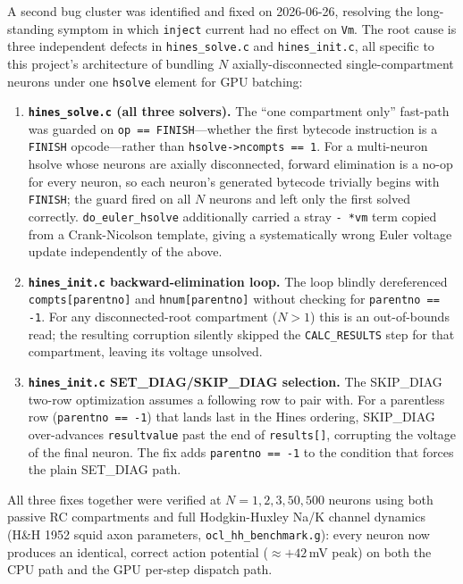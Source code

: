 \documentclass[11pt,a4paper]{article}
\begin{document}
A second bug cluster was identified and fixed on 2026-06-26, resolving the
long-standing symptom in which \texttt{inject} current had no effect on \texttt{Vm}.
The root cause is three independent defects in \texttt{hines\_solve.c} and
\texttt{hines\_init.c}, all specific to this project's architecture of bundling $N$
axially-disconnected single-compartment neurons under one \texttt{hsolve} element for
GPU batching:

\begin{enumerate}

\item \textbf{\texttt{hines\_solve.c} (all three solvers).} The ``one compartment only''
fast-path was guarded on \texttt{op == FINISH}---whether the first bytecode instruction
is a \texttt{FINISH} opcode---rather than \texttt{hsolve->ncompts == 1}. For a
multi-neuron hsolve whose neurons are axially disconnected, forward elimination is a
no-op for every neuron, so each neuron's generated bytecode trivially begins with
\texttt{FINISH}; the guard fired on all $N$ neurons and left only the first solved
correctly. \texttt{do\_euler\_hsolve} additionally carried a stray \texttt{-{} *vm}
term copied from a Crank-Nicolson template, giving a systematically wrong Euler voltage
update independently of the above.

\item \textbf{\texttt{hines\_init.c} backward-elimination loop.} The loop blindly
dereferenced \texttt{compts[parentno]} and \texttt{hnum[parentno]} without checking for
\texttt{parentno == -1}. For any disconnected-root compartment ($N > 1$) this is an
out-of-bounds read; the resulting corruption silently skipped the \texttt{CALC\_RESULTS}
step for that compartment, leaving its voltage unsolved.

\item \textbf{\texttt{hines\_init.c} SET\_DIAG/SKIP\_DIAG selection.} The SKIP\_DIAG
two-row optimization assumes a following row to pair with. For a parentless row
(\texttt{parentno == -1}) that lands last in the Hines ordering, SKIP\_DIAG
over-advances \texttt{resultvalue} past the end of \texttt{results[]}, corrupting the
voltage of the final neuron. The fix adds \texttt{parentno == -1} to the condition that
forces the plain SET\_DIAG path.

\end{enumerate}

All three fixes together were verified at $N = 1, 2, 3, 50, 500$ neurons using both
passive RC compartments and full Hodgkin-Huxley Na/K channel dynamics (H\&H 1952 squid
axon parameters, \texttt{ocl\_hh\_benchmark.g}): every neuron now produces an identical,
correct action potential ($\approx +42$\,mV peak) on both the CPU path and the GPU
per-step dispatch path.
\end{document}

